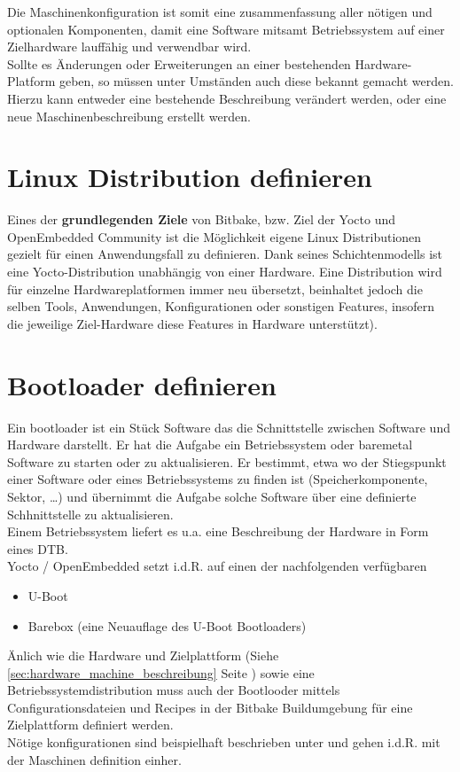 Die Maschinenkonfiguration ist somit eine zusammenfassung aller nötigen und
optionalen Komponenten, damit eine Software mitsamt Betriebssystem auf einer
Zielhardware lauffähig und verwendbar wird.  \\

Sollte es Änderungen oder Erweiterungen an einer bestehenden Hardware-Platform
geben, so müssen unter Umständen auch diese bekannt gemacht werden. Hierzu kann
entweder eine bestehende Beschreibung verändert werden, oder eine neue
Maschinenbeschreibung erstellt werden. \cite[S.
91-95]{Gonzalez2018:Embedded_Linux_Development_Using_Yocto_Project_Cookbook_2nd}


\section{Linux Distribution definieren}%
Eines der \textbf{grundlegenden Ziele} von Bitbake, bzw. Ziel der Yocto und
OpenEmbedded Community ist die Möglichkeit eigene Linux Distributionen gezielt
für einen Anwendungsfall zu definieren. Dank seines  Schichtenmodells ist eine
Yocto-Distribution unabhängig von einer Hardware. Eine Distribution wird für
einzelne Hardwareplatformen immer neu übersetzt, beinhaltet jedoch die selben
Tools, Anwendungen, Konfigurationen oder sonstigen Features, insofern die
jeweilige Ziel-Hardware diese Features in Hardware unterstützt).



\section{Bootloader definieren}%
\label{sec:bootloader_definieren}
Ein bootloader ist ein Stück Software das die Schnittstelle zwischen Software
und Hardware darstellt. Er hat die Aufgabe ein Betriebssystem oder baremetal
Software zu starten oder zu aktualisieren. Er bestimmt, etwa wo der Stiegspunkt
einer Software oder eines Betriebssystems zu finden ist (Speicherkomponente,
Sektor, \ldots) und übernimmt die Aufgabe solche Software über eine definierte
Schhnittstelle zu aktualisieren.
\\
Einem Betriebssystem liefert es u.a. eine Beschreibung der Hardware in Form
eines \gls{DTB}.
\\
Yocto / OpenEmbedded setzt i.d.R. auf einen der nachfolgenden verfügbaren

\begin{itemize}
    \item U-Boot
    \item Barebox (eine Neuauflage des U-Boot Bootloaders)
\end{itemize}

Änlich wie die Hardware und Zielplattform (Siehe \ref{sec:hardware_machine_beschreibung}
Seite \pageref{sec:hardware_machine_beschreibung}) sowie eine
Betriebssystem\-distribution muss auch der Bootlooder mittels
Configurationsdateien und Recipes in der Bitbake Buildumgebung für eine
Zielplattform definiert werden.
\\
Nötige konfigurationen sind beispielhaft beschrieben unter \cite[93-95, 98-99,
100-108]{Gonzalez2018:Embedded_Linux_Development_Using_Yocto_Project_Cookbook_2nd}
und gehen i.d.R. mit der Maschinen definition einher.
